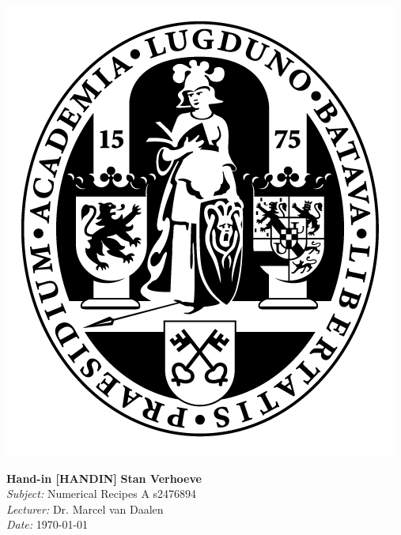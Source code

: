 \documentclass[hidelinks,a4paper,11pt]{article}
\begin{document}
\parbox{0.11\textwidth}{\includegraphics[width=\linewidth]{UL.png}}
\hspace{0.5cm}
\parbox{0.89\textwidth - 0.5cm}{
	\Large\textbf{Hand-in [HANDIN]} \hspace*{\fill} \normalsize\textbf{Stan Verhoeve}\\
	\textit{Subject:} Numerical Recipes A \hspace*{\fill}s2476894\\
	\textit{Lecturer:} Dr. Marcel van Daalen\\
	\textit{Date:} \today
}


\end{document}
